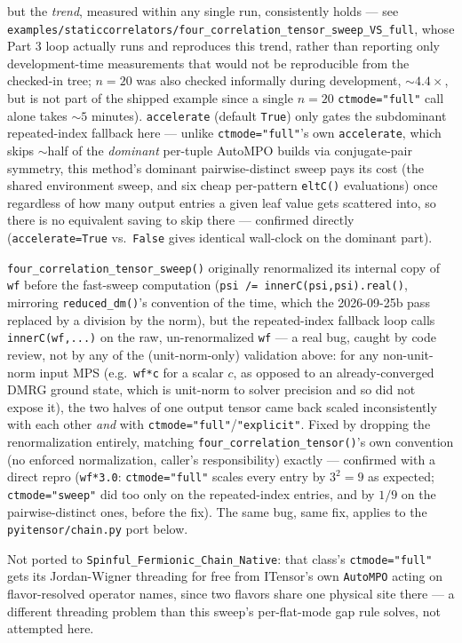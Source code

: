 \documentclass[11pt]{article}
\begin{document}
but the \emph{trend}, measured within any single run, consistently
holds --- see
\texttt{examples/staticcorrelators/four\_correlation\_tensor\_sweep\_VS\_full},
whose Part 3 loop actually runs and reproduces this trend, rather than
reporting only development-time measurements that would not be
reproducible from the checked-in tree; $n=20$ was also checked
informally during development, $\sim4.4\times$, but is not part of the
shipped example since a single $n=20$ \texttt{ctmode="full"} call alone
takes $\sim5$ minutes). \texttt{accelerate} (default \texttt{True}) only
gates the subdominant repeated-index fallback here --- unlike
\texttt{ctmode="full"}'s own \texttt{accelerate}, which skips $\sim$half
of the \emph{dominant} per-tuple AutoMPO builds via conjugate-pair
symmetry, this method's dominant pairwise-distinct sweep pays its cost
(the shared environment sweep, and six cheap per-pattern
\texttt{eltC()} evaluations) once regardless of how many output entries
a given leaf value gets scattered into, so there is no equivalent saving
to skip there --- confirmed directly (\texttt{accelerate=True} vs.\
\texttt{False} gives identical wall-clock on the dominant part).

\texttt{four\_correlation\_tensor\_sweep()} originally renormalized its
internal copy of \texttt{wf} before the fast-sweep computation
(\texttt{psi /= innerC(psi,psi).real()}, mirroring \texttt{reduced\_dm()}'s
convention of the time, which the 2026-09-25b pass replaced by a division
by the norm), but the repeated-index fallback loop calls
\texttt{innerC(wf,...)} on the raw, un-renormalized \texttt{wf} --- a
real bug, caught by code review, not by any of the (unit-norm-only)
validation above: for any non-unit-norm input MPS (e.g.\ \texttt{wf*c}
for a scalar $c$, as opposed to an already-converged DMRG ground state,
which is unit-norm to solver precision and so did not expose it), the
two halves of one output tensor came back scaled inconsistently with
each other \emph{and} with \texttt{ctmode="full"}/\texttt{"explicit"}.
Fixed by dropping the renormalization entirely, matching
\texttt{four\_correlation\_tensor()}'s own convention (no enforced
normalization, caller's responsibility) exactly --- confirmed with a
direct repro (\texttt{wf*3.0}: \texttt{ctmode="full"} scales every entry
by $3^2=9$ as expected; \texttt{ctmode="sweep"} did too only on the
repeated-index entries, and by $1/9$ on the pairwise-distinct ones,
before the fix). The same bug, same fix, applies to the
\texttt{pyitensor/chain.py} port below.

Not ported to \texttt{Spinful\_Fermionic\_Chain\_Native}: that class's
\texttt{ctmode="full"} gets its Jordan-Wigner threading for free from
ITensor's own \texttt{AutoMPO} acting on flavor-resolved operator names,
since two flavors share one physical site there --- a different
threading problem than this sweep's per-flat-mode gap rule solves, not
attempted here.
\end{document}
